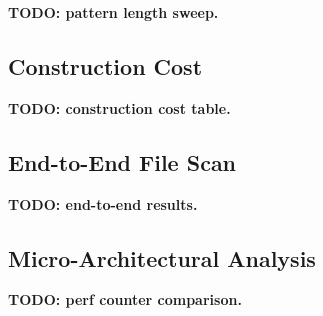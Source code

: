 \documentclass[sigconf,nonacm]{acmart}
\begin{document}
\textbf{TODO: pattern length sweep.}


\subsection{Construction Cost}
\label{sec:eval-construction}

%

\textbf{TODO: construction cost table.}


\subsection{End-to-End File Scan}
\label{sec:eval-e2e}

%

\textbf{TODO: end-to-end results.}


\subsection{Micro-Architectural Analysis}
\label{sec:eval-perf}

%

\textbf{TODO: perf counter comparison.}

\end{document}
